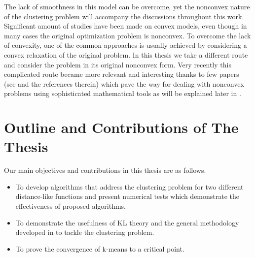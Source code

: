 The lack of smoothness in this model can be overcome, yet the nonconvex nature of the clustering problem will accompany the discussions throughout this work. Significant amount of studies have been made on convex models, even though in many cases the original optimization problem is nonconvex. To overcome the lack of convexity, one of the common approaches is usually achieved by considering a convex relaxation of the original problem. In this thesis we take a different route and consider the problem in its original nonconvex form. Very recently this complicated route became more relevant and interesting thanks to few papers (see \cite{AB2009,ABS2013,BST2014} and the references therein) which pave the way for dealing with nonconvex problems using sophisticated mathematical tools as will be explained later in .


\section{Outline and Contributions of The Thesis}

Our main objectives and contributions in this thesis are as follows.
\begin{itemize}
	\item To develop algorithms that address the clustering problem for two different distance-like functions and present numerical tests which demonstrate the effectiveness of proposed algorithms.
	
	\item To demonstrate the usefulness of KL theory and the general methodology developed in \cite{BST2014} to tackle the clustering problem.
  
	\item To prove the convergence of k-means to a critical point.
\end{itemize}

